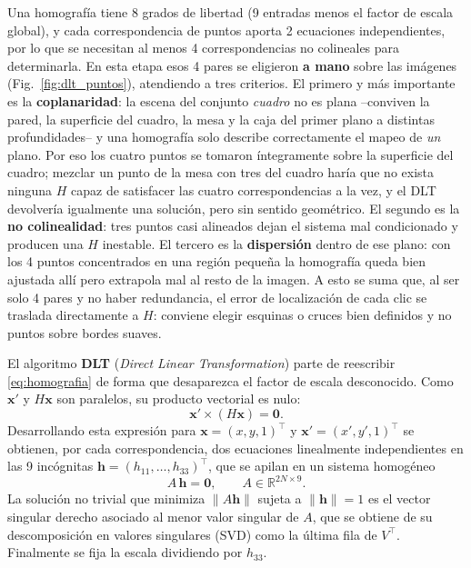 \documentclass[conference]{IEEEtran}
\begin{document}
Una homografía tiene 8 grados de libertad (9 entradas menos el factor de escala global), y cada correspondencia de puntos aporta 2 ecuaciones independientes, por lo que se necesitan al menos 4 correspondencias no colineales para determinarla. En esta etapa esos 4 pares se eligieron \textbf{a mano} sobre las imágenes (Fig.~\ref{fig:dlt_puntos}), atendiendo a tres criterios. El primero y más importante es la \textbf{coplanaridad}: la escena del conjunto \textit{cuadro} no es plana --conviven la pared, la superficie del cuadro, la mesa y la caja del primer plano a distintas profundidades-- y una homografía solo describe correctamente el mapeo de \emph{un} plano. Por eso los cuatro puntos se tomaron íntegramente sobre la superficie del cuadro; mezclar un punto de la mesa con tres del cuadro haría que no exista ninguna $H$ capaz de satisfacer las cuatro correspondencias a la vez, y el DLT devolvería igualmente una solución, pero sin sentido geométrico. El segundo es la \textbf{no colinealidad}: tres puntos casi alineados dejan el sistema mal condicionado y producen una $H$ inestable. El tercero es la \textbf{dispersión} dentro de ese plano: con los 4 puntos concentrados en una región pequeña la homografía queda bien ajustada allí pero extrapola mal al resto de la imagen. A esto se suma que, al ser solo 4 pares y no haber redundancia, el error de localización de cada clic se traslada directamente a $H$: conviene elegir esquinas o cruces bien definidos y no puntos sobre bordes suaves.

El algoritmo \textbf{DLT} (\textit{Direct Linear Transformation}) parte de reescribir \eqref{eq:homografia} de forma que desaparezca el factor de escala desconocido. Como $\mathbf{x}'$ y $H\mathbf{x}$ son paralelos, su producto vectorial es nulo:
\begin{equation}
\mathbf{x}' \times (H\mathbf{x}) = \mathbf{0}.
\end{equation}
Desarrollando esta expresión para $\mathbf{x}=(x,y,1)^\top$ y $\mathbf{x}'=(x',y',1)^\top$ se obtienen, por cada correspondencia, dos ecuaciones linealmente independientes en las 9 incógnitas $\mathbf{h}=(h_{11},\dots,h_{33})^\top$, que se apilan en un sistema homogéneo
\begin{equation}
A\,\mathbf{h} = \mathbf{0}, \qquad A \in \mathbb{R}^{2N\times9}.
\end{equation}
La solución no trivial que minimiza $\lVert A\mathbf{h}\rVert$ sujeta a $\lVert \mathbf{h}\rVert = 1$ es el vector singular derecho asociado al menor valor singular de $A$, que se obtiene de su descomposición en valores singulares (SVD) como la última fila de $V^\top$. Finalmente se fija la escala dividiendo por $h_{33}$.
\end{document}
